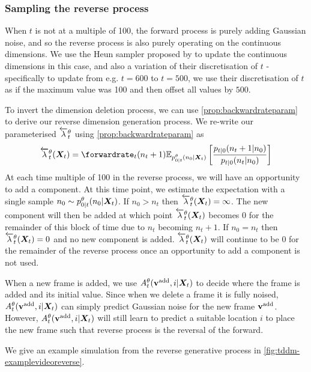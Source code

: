 \subsubsection{Sampling the reverse process}

When $t$ is not at a multiple of 100, the forward process is purely adding Gaussian noise, and so the reverse process is also purely operating on the continuous dimensions. We use the Heun sampler proposed by \citet{karras2022elucidating} to update the continuous dimensions in this case, and also a variation of their discretisation of $t$ - specifically to update from e.g. $t=600$ to $t=500$, we use their discretisation of $t$ as if the maximum value was 100 and then offset all values by $500$. 

To invert the dimension deletion process, we can use \cref{prop:backwardrateparam} to derive our reverse dimension generation process. We re-write our parameterised $\overleftarrow{\lambda}_t^\theta$ using \cref{prop:backwardrateparam} as 
\begin{equation}
    \backwardrate_t^\theta(\mX_t) = \forwardrate_t(n_t + 1) \mathbb{E}_{p_{0|t}^\theta(n_0 | \mX_t)} \left[ \frac{p_{t|0}(n_t + 1 | n_0)}{p_{t|0}(n_t | n_0)}\right]
\end{equation}
At each time multiple of 100 in the reverse process, we will have an opportunity to add a component. At this time point, we estimate the expectation with a single sample $n_0 \sim p_{0|t}^\theta(n_0 | {\bm{X}}_t)$. If $n_0 > n_t$ then $\overleftarrow{\lambda}_t^\theta({\bm{X}}_t) = \infty$. The new component will then be added at which point $\overleftarrow{\lambda}_t^\theta({\bm{X}}_t)$ becomes $0$ for the remainder of this block of time due to $n_t$ becoming $n_t+1$. If $n_0 = n_t$ then $\overleftarrow{\lambda}_t^\theta({\bm{X}}_t) = 0$ and no new component is added. $\overleftarrow{\lambda}_t^\theta({\bm{X}}_t)$ will continue to be $0$ for the remainder of the reverse process once an opportunity to add a component is not used.

When a new frame is added, we use $A_t^\theta({\mathbf{v}}^{\textup{add}}, i | {\bm{X}}_t)$ to decide where the frame is added and its initial value. Since when we delete a frame it is fully noised, $A_t^\theta({\mathbf{v}}^{\textup{add}}, i | {\bm{X}}_t)$ can simply predict Gaussian noise for the new frame ${\mathbf{v}}^{\textup{add}}$. However, $A_t^\theta({\mathbf{v}}^{\textup{add}}, i | {\bm{X}}_t)$ will still learn to predict a suitable location $i$ to place the new frame such that reverse process is the reversal of the forward.

We give an example simulation from the reverse generative process in \cref{fig:tddm-examplevideoreverse}.

